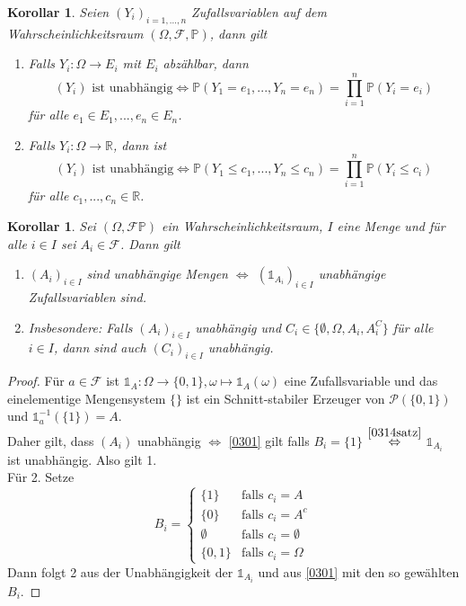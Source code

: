 \documentclass[10pt,a4paper]{article}
\newcommand{\R}{\ensuremath{\mathbb{R}}}
\newcommand{\cha}{\mathds{1}}
\newcommand{\Potset}{\mathscr P}
\newcommand{\Prb}{\mathbb P}
\newcommand{\scF}{\ensuremath{\mathscr{F}}}
\theoremstyle{plain}
\newtheorem{kor}[theorem]{Korollar}
\theoremstyle{definition}
\theoremstyle{remark}
\begin{document}
	\begin{kor}
		Seien $(Y_i)_{i=1,...,n}$ Zufallsvariablen auf dem Wahrscheinlichkeitsraum $(\Omega,\scF,\Prb)$, dann gilt
		\begin{enumerate}[label=\alph*)]
			\item Falls $Y_i:\Omega\to E_i$ mit $E_i$ abzählbar, dann
			\[\text{$(Y_i)$ ist unabhängig}\Leftrightarrow\Prb(Y_1=e_1,...,Y_n=e_n)=\prod_{i=1}^n\Prb(Y_i=e_i)\]
			für alle $e_1\in E_1,...,e_n\in E_n$.
			\item Falls $Y_i:\Omega\to\R$, dann ist
			\[\text{$(Y_i)$ ist unabhängig}\Leftrightarrow\Prb(Y_1\leq c_1,...,Y_n\leq c_n)=\prod_{i=1}^n\Prb(Y_i\leq c_i)\]
			für alle $c_1,...,c_n\in\R$.
		\end{enumerate}
	\end{kor}

	\begin{kor}
		Sei $(\Omega,\scF\Prb)$ ein Wahrscheinlichkeitsraum, $I$ eine Menge und für alle $i\in I$ sei $A_i\in\scF$. Dann gilt
		\begin{enumerate}
			\item $(A_i)_{i\in I}$ sind unabhängige Mengen $\Leftrightarrow$ $(\cha_{A_i})_{i\in I}$ unabhängige Zufallsvariablen sind.
			\item Insbesondere: Falls $(A_i)_{i\in I}$ unabhängig und $C_i\in\{\emptyset,\Omega,A_i,A_i^C\}$ für alle $i\in I$, dann sind auch $(C_i)_{i\in I}$ unabhängig.
		\end{enumerate}
	\end{kor}
	\begin{proof}
		Für $a\in\scF$ ist $\cha_A:\Omega\to\{0,1\}, \omega\mapsto\cha_A(\omega)$ eine Zufallsvariable und das einelementige Mengensystem $\big\{\big\}$ ist ein Schnitt-stabiler Erzeuger von $\Potset(\{0,1\})$ und $\cha_a^{-1}(\{1\})=A$.\\
		Daher gilt, dass $(A_i)$ unabhängig $\Leftrightarrow$ \ref{0301}  gilt falls $B_i=\{1\}$ $\overset{\ref{0314satz}}{\Leftrightarrow}$ $\cha_{A_i}$ ist unabhängig. Also gilt 1.\\
		Für 2. Setze
		\[B_i=\begin{cases}
		\{1\}&\text{falls $c_i=A$}\\
		\{0\}&\text{falls $c_i=A^c$}\\
		\emptyset&\text{falls $c_i=\emptyset$}\\
		\{0,1\}&\text{falls $c_i=\Omega$}
		\end{cases}\]
		Dann folgt 2 aus der Unabhängigkeit der $\cha_{A_i}$ und aus \ref{0301} mit den so gewählten $B_i$.
	\end{proof}
\end{document}
